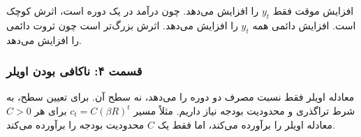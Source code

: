 \documentclass[12pt,a4paper]{article}
\begin{document}
افزایش موقت فقط $y_t$ را افزایش می‌دهد. چون درآمد در یک دوره است، اثرش کوچک است. افزایش دائمی همه $y_t$ را افزایش می‌دهد. اثرش بزرگ‌تر است چون ثروت دائمی را افزایش می‌دهد.

\subsubsection*{قسمت ۴: ناکافی بودن اویلر}

معادله اویلر فقط نسبت مصرف دو دوره را می‌دهد، نه سطح آن. برای تعیین سطح، به شرط تراگذری و محدودیت بودجه نیاز داریم. مثلاً مسیر $c_t = C(\beta R)^t$ برای هر $C > 0$ معادله اویلر را برآورده می‌کند، اما فقط یک $C$ محدودیت بودجه را برآورده می‌کند.
\end{document}
